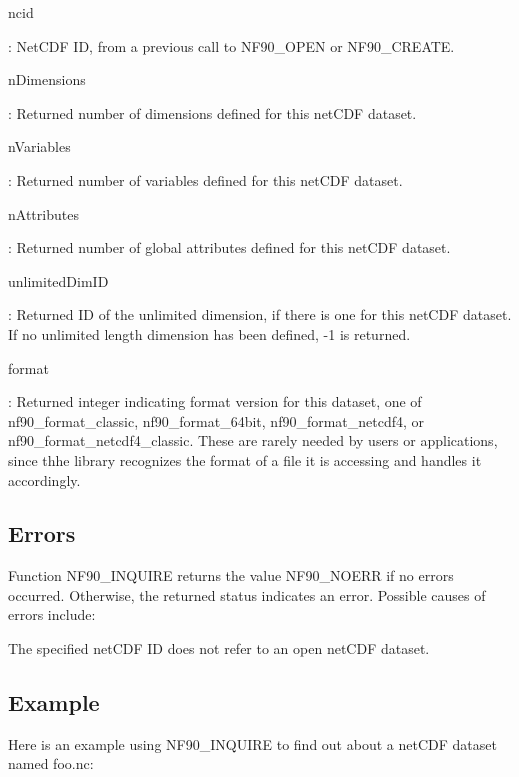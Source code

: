 {\ttfamily ncid}

\+: Net\+C\+DF ID, from a previous call to N\+F90\+\_\+\+O\+P\+EN or N\+F90\+\_\+\+C\+R\+E\+A\+TE.

{\ttfamily n\+Dimensions}

\+: Returned number of dimensions defined for this net\+C\+DF dataset.

{\ttfamily n\+Variables}

\+: Returned number of variables defined for this net\+C\+DF dataset.

{\ttfamily n\+Attributes}

\+: Returned number of global attributes defined for this net\+C\+DF dataset.

{\ttfamily unlimited\+Dim\+ID}

\+: Returned ID of the unlimited dimension, if there is one for this net\+C\+DF dataset. If no unlimited length dimension has been defined, -\/1 is returned.

{\ttfamily format}

\+: Returned integer indicating format version for this dataset, one of nf90\+\_\+format\+\_\+classic, nf90\+\_\+format\+\_\+64bit, nf90\+\_\+format\+\_\+netcdf4, or nf90\+\_\+format\+\_\+netcdf4\+\_\+classic. These are rarely needed by users or applications, since thhe library recognizes the format of a file it is accessing and handles it accordingly.

\subsection*{Errors}

Function N\+F90\+\_\+\+I\+N\+Q\+U\+I\+RE returns the value N\+F90\+\_\+\+N\+O\+E\+RR if no errors occurred. Otherwise, the returned status indicates an error. Possible causes of errors include\+:


\begin{DoxyItemize}
\item The specified net\+C\+DF ID does not refer to an open net\+C\+DF dataset.
\end{DoxyItemize}

\subsection*{Example}

Here is an example using N\+F90\+\_\+\+I\+N\+Q\+U\+I\+RE to find out about a net\+C\+DF dataset named foo.\+nc\+:


